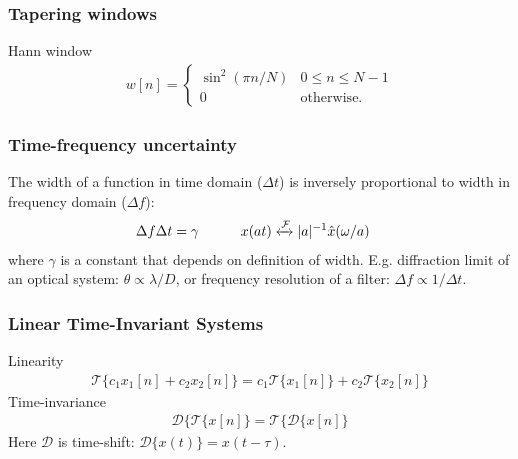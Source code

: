 \documentclass[6pt,landscape,a4paper]{article}
\begin{document}
\begin{multicols*}{5}
\subsubsection*{Tapering windows}
Hann window
\begin{align*}
  w[n] =\left\{ \begin{array}{cc}
    \sin^2(\pi n/N) & 0 \le n \le N-1     \\
    0               & \mathrm{otherwise}.
  \end{array}
  \right.
  \label{eq:hann_window_def}
\end{align*}
\subsubsection*{Time-frequency uncertainty}
The width of a function in time domain ($\Delta t$) is inversely proportional to width in frequency domain ($\Delta f$):
\vspace{-0.5em}
\begin{align*}
&\Delta f \Delta t = \gamma  \hspace{3em} x(at) \xleftrightarrow{\mathcal{F}} |a|^{-1}\hat{x}(\omega/a)
\end{align*}
where $\gamma$ is a constant that depends on definition of width. E.g. diffraction limit of an optical system: $\theta \propto \lambda/D$, or frequency resolution of a filter: $\Delta f \propto 1/\Delta t$.
\subsubsection*{Linear Time-Invariant Systems}
Linearity
\vspace{-0.5em}
\begin{align*}
\mathcal{T}\{ c_1 x_1[n] + c_2 x_2[n]\}=c_1\mathcal{T}\{ x_1[n] \} + c_2 \mathcal{T}\{ x_2[n] \}
\end{align*}
Time-invariance
\vspace{-0.5em}
\begin{align*}
\mathcal{D}\{\mathcal{T}\{ x[n] \} = \mathcal{T}\{\mathcal{D}\{ x[n] \} 
\end{align*}
Here $\mathcal{D}$ is time-shift: $\mathcal{D}\{x(t)\}=x(t-\tau)$.


\end{multicols*}
\end{document}
